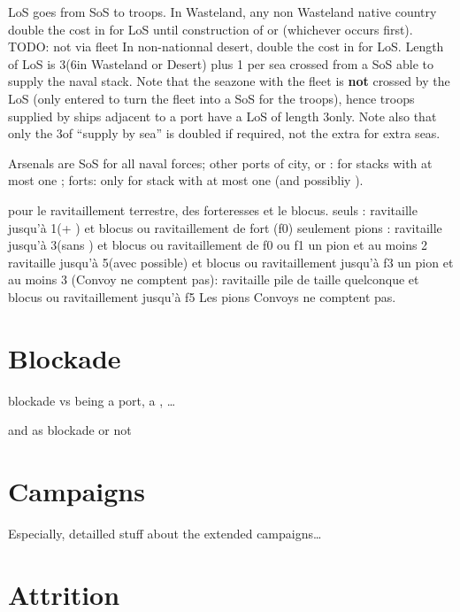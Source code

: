  LoS goes from SoS to troops.
\bparag In Wasteland, any non Wasteland native country double the cost in \MP
for LoS until construction of  or  (whichever occurs first). TODO: not via fleet
\bparag In non-nationnal desert, double the cost in \MP for LoS.
 Length of LoS is 3\MP (6\MP in
Wasteland or Desert) plus 1 per sea crossed from a SoS able to supply the
naval stack.
\bparag Note that the seazone with the fleet is \textbf{not} crossed by the
LoS (only entered to turn the fleet into a SoS for the troops), hence troops
supplied by ships adjacent to a port have a LoS of length 3\MP only.
\bparag Note also that only the 3\MP of ``supply by sea'' is doubled if
required, not the extra \MP for extra seas.

Arsenals are SoS for all naval forces; other ports of city, \COL or \TP: for
stacks with at most one \FLEET; forts: only for stack with at most one \ND
(and possibliy \NDE).

 pour le ravitaillement terrestre, des
forteresses et le blocus.
\bparag \de seuls : ravitaille jusqu'à 1\DT (+ \LDE) et blocus ou ravitaillement de fort (f0) seulement
\bparag pions \DN : ravitaille jusqu'à 3\DT (sans \ARMY) et blocus ou ravitaillement de f0 ou f1
\bparag un pion \FLEET et au moins 2 \ND ravitaille jusqu'à 5\DT (avec \ARMY possible) et blocus ou ravitaillement jusqu'à f3
\bparag un pion \FLEET\faceplus et au moins 3 \ND (Convoy ne comptent pas): ravitaille pile
de taille quelconque et blocus ou ravitaillement jusqu'à f5
\bparag Les pions Convoys ne comptent pas.

\section{Blockade}
blockade vs being a port, a \SoS, \ldots

\Presidio and \USURE as blockade or not

\section{Campaigns}
Especially, detailled stuff about the extended campaigns\ldots

\section{Attrition}
